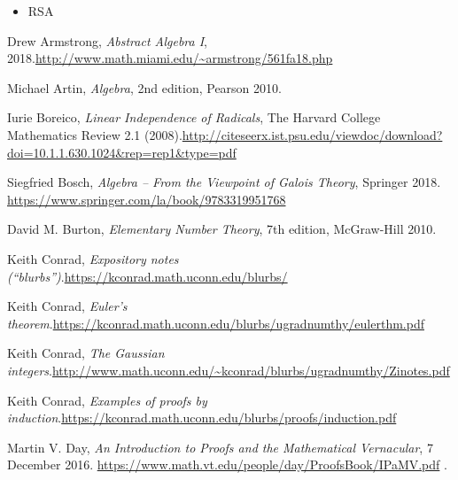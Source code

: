 \documentclass[numbers=enddot,12pt,final,onecolumn,notitlepage]{scrartcl}%
\numberwithin{exer}{subsection}
\theoremstyle{definition}
\begin{document}
\begin{itemize}
\item RSA
\end{itemize}

\begin{thebibliography}{999999999}                                                                                        %


Drew Armstrong, \textit{Abstract Algebra I},
2018.\newline\url{http://www.math.miami.edu/~armstrong/561fa18.php}

Michael Artin, \textit{Algebra}, 2nd edition, Pearson 2010.

Iurie Boreico, \textit{Linear Independence of
Radicals}, The Harvard College Mathematics Review 2.1 (2008).\newline\url{http://citeseerx.ist.psu.edu/viewdoc/download?doi=10.1.1.630.1024&rep=rep1&type=pdf}

Siegfried Bosch, \textit{Algebra -- From the Viewpoint
of Galois Theory}, Springer 2018. \newline\url{https://www.springer.com/la/book/9783319951768}

David M. Burton, \textit{Elementary Number Theory},
7th edition, McGraw-Hill 2010.

Keith Conrad, \textit{Expository notes
(\textquotedblleft blurbs\textquotedblright)}.\newline\url{https://kconrad.math.uconn.edu/blurbs/}

Keith Conrad, \textit{Euler's theorem}.\newline\url{https://kconrad.math.uconn.edu/blurbs/ugradnumthy/eulerthm.pdf}

Keith Conrad, \textit{The Gaussian
integers}.\newline\url{http://www.math.uconn.edu/~kconrad/blurbs/ugradnumthy/Zinotes.pdf}

Keith Conrad, \textit{Examples of proofs by
induction}.\newline\url{https://kconrad.math.uconn.edu/blurbs/proofs/induction.pdf}

Martin V. Day, \textit{An Introduction to Proofs and the
Mathematical Vernacular}, 7 December 2016.\newline%
\url{https://www.math.vt.edu/people/day/ProofsBook/IPaMV.pdf} .


\end{thebibliography}
\end{document}

